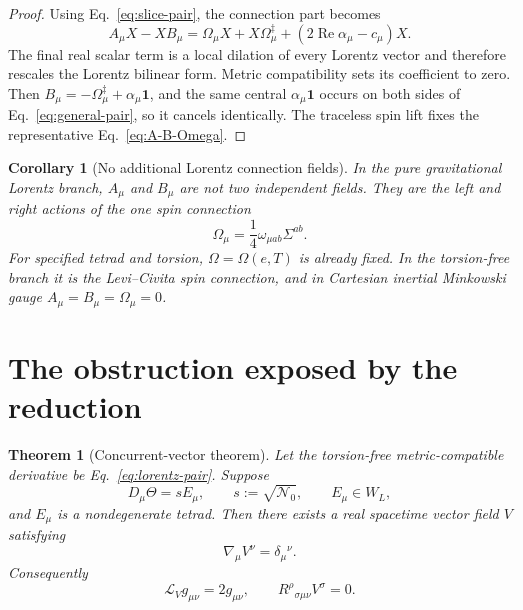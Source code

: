 \documentclass[12pt,a4paper]{article}
\newtheorem{theorem}[definition]{Theorem}
\newtheorem{corollary}[definition]{Corollary}
\theoremstyle{remark}\newtheorem{remark}[definition]{Remark}
\begin{document}
\begin{proof}
Using Eq.~\eqref{eq:slice-pair}, the connection part becomes
\begin{equation}
 A_\mu X-XB_\mu
 =\Omega_\mu X+X\Omega_\mu^\ddagger
 +(2\operatorname{Re}\alpha_\mu-c_\mu)X.
\end{equation}
The final real scalar term is a local dilation of every Lorentz vector and
therefore rescales the Lorentz bilinear form.  Metric compatibility sets its
coefficient to zero.  Then
$B_\mu=-\Omega_\mu^\ddagger+\alpha_\mu\mathbf1$, and the same central
$\alpha_\mu\mathbf1$ occurs on both sides of Eq.~\eqref{eq:general-pair}, so
it cancels identically.  The traceless spin lift fixes the representative
Eq.~\eqref{eq:A-B-Omega}.
\end{proof}

\begin{corollary}[No additional Lorentz connection fields]
In the pure gravitational Lorentz branch, $A_\mu$ and $B_\mu$ are not two
independent fields.  They are the left and right actions of the one spin
connection
\begin{equation}
 \Omega_\mu=\frac14\omega_{\mu ab}\Sigma^{ab}.
\end{equation}
For specified tetrad and torsion,
$\Omega=\Omega(e,T)$ is already fixed.  In the torsion-free branch it is the
Levi--Civita spin connection, and in Cartesian inertial Minkowski gauge
$A_\mu=B_\mu=\Omega_\mu=0$.
\end{corollary}

\section{The obstruction exposed by the reduction}
\begin{theorem}[Concurrent-vector theorem]
Let the torsion-free metric-compatible derivative be
Eq.~\eqref{eq:lorentz-pair}.  Suppose
\begin{equation}
 D_\mu\Theta=sE_\mu,\qquad s:=\sqrt{\mathcal N_0},
 \qquad E_\mu\in W_L,
 \label{eq:tetrad-generation}
\end{equation}
and $E_\mu$ is a nondegenerate tetrad.  Then there exists a real spacetime
vector field $V$ satisfying
\begin{equation}
 \boxed{\nabla_\mu V^\nu=\delta_\mu{}^\nu.}
 \label{eq:concurrent}
\end{equation}
Consequently
\begin{equation}
 \mathcal L_Vg_{\mu\nu}=2g_{\mu\nu},
 \qquad
 R^\rho{}_{\sigma\mu\nu}V^\sigma=0.
 \label{eq:homothety-curvature}
\end{equation}
\end{theorem}
\end{document}
